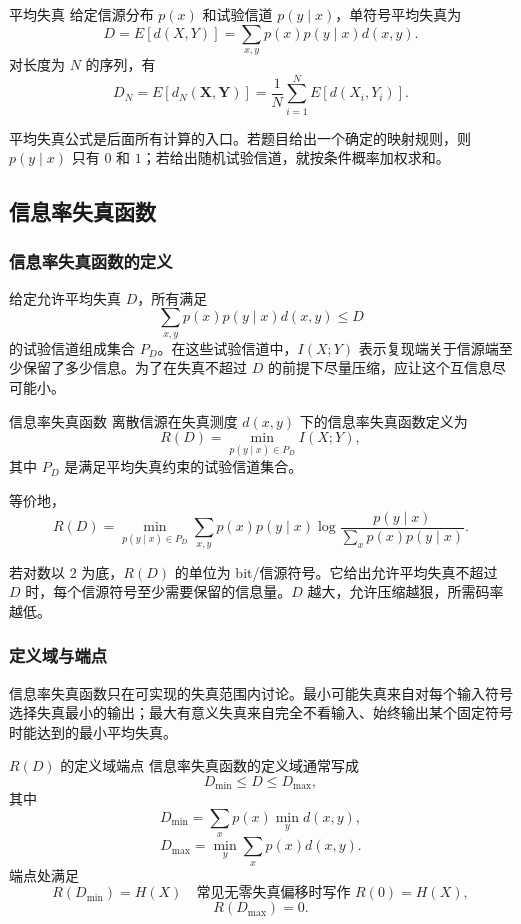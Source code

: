 \begin{formulaBox}{平均失真}
给定信源分布 $p(x)$ 和试验信道 $p(y\mid x)$，单符号平均失真为
\[
D=E[d(X,Y)]=\sum_{x,y}p(x)p(y\mid x)d(x,y).
\]
对长度为 $N$ 的序列，有
\[
D_N=E[d_N(\mathbf X,\mathbf Y)]
=\frac1N\sum_{i=1}^{N}E[d(X_i,Y_i)].
\]
\end{formulaBox}

平均失真公式是后面所有计算的入口。若题目给出一个确定的映射规则，则 $p(y\mid x)$ 只有 $0$ 和 $1$；若给出随机试验信道，就按条件概率加权求和。

\subsection{信息率失真函数}

\subsubsection{信息率失真函数的定义}

给定允许平均失真 $D$，所有满足
\[
\sum_{x,y}p(x)p(y\mid x)d(x,y)\le D
\]
的试验信道组成集合 $P_D$。在这些试验信道中，$I(X;Y)$ 表示复现端关于信源端至少保留了多少信息。为了在失真不超过 $D$ 的前提下尽量压缩，应让这个互信息尽可能小。

\begin{definitionBox}{信息率失真函数}
离散信源在失真测度 $d(x,y)$ 下的信息率失真函数定义为
\[
R(D)=\min_{p(y\mid x)\in P_D} I(X;Y),
\]
其中 $P_D$ 是满足平均失真约束的试验信道集合。

等价地，
\[
R(D)=\min_{p(y\mid x)\in P_D}
\sum_{x,y}p(x)p(y\mid x)
\log\frac{p(y\mid x)}{\sum_x p(x)p(y\mid x)}.
\]
\end{definitionBox}

若对数以 $2$ 为底，$R(D)$ 的单位为 bit/信源符号。它给出允许平均失真不超过 $D$ 时，每个信源符号至少需要保留的信息量。$D$ 越大，允许压缩越狠，所需码率越低。

\subsubsection{定义域与端点}

信息率失真函数只在可实现的失真范围内讨论。最小可能失真来自对每个输入符号选择失真最小的输出；最大有意义失真来自完全不看输入、始终输出某个固定符号时能达到的最小平均失真。

\begin{formulaBox}{$R(D)$ 的定义域端点}
信息率失真函数的定义域通常写成
\[
D_{\min}\le D\le D_{\max},
\]
其中
\[
D_{\min}=\sum_x p(x)\min_y d(x,y),
\]
\[
D_{\max}=\min_y\sum_x p(x)d(x,y).
\]
端点处满足
\[
R(D_{\min})=H(X)\quad\text{常见无零失真偏移时写作 }R(0)=H(X),
\]
\[
R(D_{\max})=0.
\]
\end{formulaBox}

